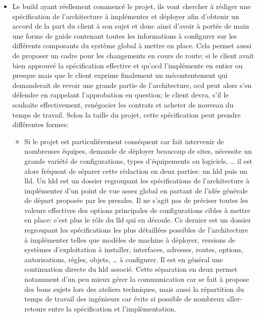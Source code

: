 \documentclass[12pt, oneside, a4paper, titlepage]{report}
\begin{document}
\begin{itemize}
    \item Le \gls{build} ayant réellement commencé le projet, ils vont chercher
        à rédiger une spécification de l'architecture à implémenter et déployer
        afin d'obtenir un accord de la part du client à son sujet et donc ainsi
        d'avoir à portée de main une forme de guide contenant toutes les
        informations à configurer sur les différents composants du système
        global à mettre en place. Cela permet aussi de proposer un cadre pour
        les changements en cours de route: si le client avait bien approuvé la
        spécification effective et qu'\acrlong{ocd} l'implémente en entier ou
        presque mais que le client exprime finalement un mécontentement qui
        demanderait de revoir une grande partie de l'architecture, \gls{ocd}
        peut alors s'en défendre en rappelant l'approbation en question; le
        client devra, s'il le souhaite effectivement, renégocier les contrats et
        acheter de nouveau du temps de travail. Selon la taille du projet, cette
        spécification peut prendre différentes formes:

    \begin{itemize}

        \item Si le projet est particulièrement conséquent car fait intervenir
            de nombreuses équipes, demande de déployer beaucoup de sites,
            nécessite un grande variété de configurations, types d'équipements
            ou logiciels, \ldots{} il est alors fréquent de séparer cette
            rédaction en deux parties: un \gls{hld} puis un \gls{lld}. Un
            \gls{hld} est un dossier regroupant les spécifications de
            l'architecture à implémenter d'un point de vue assez global en
            partant de l'idée générale de départ proposée par les
            \gls{presales}. Il ne s'agit pas de préciser toutes les valeurs
            effectives des options principales de configurations cibles à mettre
            en place: c'est plus le rôle du \gls{lld} qui en découle. Ce dernier
            est un dossier regroupant les spécifications les plus détaillées
            possibles de l'architecture à implémenter telles que modèles de
            machine à déployer, versions de systèmes d'exploitation à installer,
            interfaces, adresses, routes, options, autorisations, règles,
            objets, \ldots{} à configurer. Il est en général une continuation
            directe du \gls{hld} associé. Cette séparation en deux permet
            notamment d'un peu mieux gérer la communication car se fait à
            propose des bons sujets lors des ateliers techniques, mais aussi la
            répartition du temps de travail des ingénieurs car évite si possible
            de nombreux aller-retours entre la spécification et
            l'implémentation.


\end{itemize}
\end{itemize}
\end{document}
